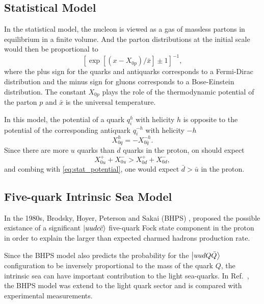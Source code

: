 \documentclass[../main.tex]{subfiles}
\begin{document}
\subsection{Statistical Model}
In the statistical model\cite{bourrely2015}, the nucleon is viewed as a gas of massless partons in equilibrium in
a finite volume. And the parton distributions at the initial scale would then be proportional to
\begin{equation}
	\left[ \exp\left[\left(x-X_{0p}\right)/\bar{x}\right] \pm 1 \right]^{-1},
\end{equation}
where the plus sign for the quarks and antiquarks corresponds to a Fermi-Dirac distribution and
the minus sign for gluons corresponds to a Bose-Einstein distribution. The constant $X_{0p}$
plays the role of the thermodynamic potential of the parton $p$ and $\bar{x}$ is the universal
temperature.

In this model, the potential of a quark $q_i^h$ with helicity $h$ is opposite to the potential
of the corresponding antiquark $q_i^{-h}$ with helicity $-h$
\begin{equation}
	X_{0q}^h = -X_{0\bar{q}}^{-h}.
	\label{eq:stat_potential}
\end{equation}
Since there are more $u$ quarks than $d$ quarks in the proton, on should expect
\begin{equation}
	X_{0u}^+ + X_{0u}^- > X_{0d}^+ + X_{0d}^-,
\end{equation}
and combing with \cref{eq:stat_potential}, one would expect $\bar{d} > \bar{u}$ in the proton.

\subsection{Five-quark Intrinsic Sea Model}
In the 1980s, Brodsky, Hoyer, Peterson and Sakai (BHPS) \cite{brodsky1980}, proposed 
the possible existance of a significant $\ket{uudc\bar{c}}$ five-quark Fock state component
in the proton in order to explain the larger than expected charmed hadrons production rate.


Since the BHPS model also predicts the probability for the $\ket{uudQ\bar{Q}}$ configuration to
be inversely proportional to the mass of the quark $Q$, the intrinsic sea can have important
contribution to the light sea-quarks. In Ref.~\cite{chang2011,chang2011a}, the BHPS model 
was extend to the light quark sector and is compared with experimental measurements.
\end{document}
